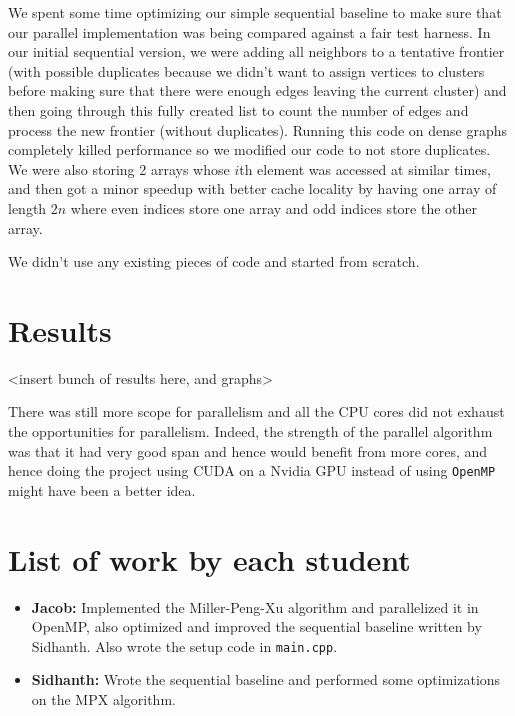 \documentclass[11pt]{scrartcl}
\theoremstyle{plain}
\theoremstyle{definition}
\theoremstyle{remark}
\begin{document}
We spent some time optimizing our simple sequential
baseline to make sure that our parallel implementation
was being compared against a fair test harness.
In our initial sequential version, we were adding
all neighbors to a tentative frontier (with possible
duplicates because we didn't want to assign vertices
to clusters before making sure that there were enough
edges leaving the current cluster) and then going
through this fully created list to count the number
of edges and process the new frontier (without
duplicates). Running this code on dense graphs
completely killed performance so we modified our
code to not store duplicates. We were also
storing 2 arrays whose $i$th element was accessed
at similar times, and then got a minor speedup
with better cache locality by having one array
of length $2n$ where even indices store one array
and odd indices store the other array.

We didn't use any existing pieces of code and started from
scratch.

\section{Results}

<insert bunch of results here, and graphs>

There was still more scope for parallelism and all the
CPU cores did not exhaust the opportunities for parallelism.
Indeed, the strength of the parallel algorithm was that
it had very good span and hence would benefit from
more cores, and hence doing the project using CUDA
on a Nvidia GPU instead of using \texttt{OpenMP} might have
been a better idea.

\section{List of work by each student}
\begin{itemize}

\item \textbf{Jacob:} Implemented the Miller-Peng-Xu
algorithm and parallelized it in OpenMP, also optimized
and improved the sequential baseline written by Sidhanth.
Also wrote the setup code in \texttt{main.cpp}.

\item \textbf{Sidhanth:} Wrote the sequential baseline and
performed some optimizations on the MPX algorithm.

\end{itemize}



\end{document}
